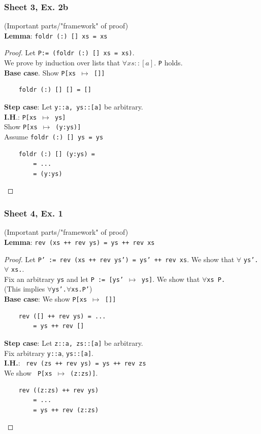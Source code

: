 \documentclass{article}
\begin{document}
\subsubsection{Sheet 3, Ex. 2b}
(Important parts/"framework" of proof) \\
\textbf{Lemma}: \texttt{foldr (:) [] xs = xs}
\begin{proof}
    Let \texttt{P:= (foldr (:) [] xs = xs)}. \\
    We prove by induction over lists that $\forall xs::[a].$ \texttt{P} holds. \\
    \textbf{Base case}. Show \texttt{P[xs $\mapsto$ []]} 
    \begin{verbatim}
    foldr (:) [] [] = [] 
    \end{verbatim}
    \textbf{Step case}: Let \texttt{y::a, ys::[a]} be arbitrary. \\
    \textbf{I.H}.: \texttt{P[xs $\mapsto$ ys]}\\
    Show \texttt{P[xs $\mapsto$ (y:ys)]} \\
    Assume \texttt{foldr (:) [] ys = ys} %
    \begin{verbatim}
    foldr (:) [] (y:ys) = 
        = ...
        = (y:ys)
    \end{verbatim}
\end{proof}
\subsubsection{Sheet 4, Ex. 1}
(Important parts/"framework" of proof) \\
\textbf{Lemma}: \texttt{rev (xs ++ rev ys) = ys ++ rev xs}
\begin{proof}
    Let \texttt{P' := rev (xs ++ rev ys') = ys' ++ rev xs}. 
    We show that $\forall$ \texttt{ys'.}$\forall$ \texttt{xs.}. \\
    Fix an arbitrary \texttt{ys} and let \texttt{P := [ys' $\mapsto$ ys]}.
    We show that $\forall$\texttt{xs P.} \\
    (This implies $\forall$\texttt{ys'.}$\forall$\texttt{xs.P'}) \\
    \textbf{Base case}: We show \texttt{P[xs $\mapsto$ []]} 
    \begin{verbatim}
    rev ([] ++ rev ys) = ...
        = ys ++ rev []
    \end{verbatim}
    \textbf{Step case}: Let \texttt{z::a, zs::[a]} be arbitrary. \\
    Fix arbitrary \texttt{y::a}, \texttt{ys::[a]}. \\
    \textbf{I.H.}: \texttt{ rev (zs ++ rev ys) = ys ++ rev zs}  \\
    We show \texttt{ P[xs $\mapsto$ (z:zs)]}.
    \begin{verbatim}
    rev ((z:zs) ++ rev ys)
        = ...
        = ys ++ rev (z:zs)
    \end{verbatim}
\end{proof}
\end{document}
